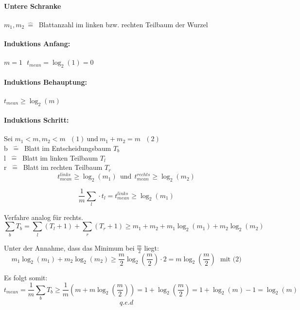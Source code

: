\vspace{30pt}
\paragraph{Untere Schranke}
$m_1, m_2 ~\hat{=}~$ Blattanzahl im linken bzw. rechten Teilbaum der Wurzel
\vspace{100pt}

\paragraph{Induktions Anfang:} $m=1 ~~~ t_{mean} = \log_2(1)=0$

\paragraph{Induktions Behauptung:} $t_{mean} \geq \log_2(m)$

\paragraph{Induktions Schritt:} Sei $m_1 < m, m_2 < m ~~~(1) ~\text{und}~ m_1+m_2=m ~~~(2)$ \\

b $~\hat{=}~$ Blatt im Entscheidungsbaum $T_b$\\
l $~\hat{=}~$ Blatt im linken Teilbaum $T_l$\\
r $~\hat{=}~$ Blatt im rechten Teilbaum $T_r$\\

\[t^{links}_{mean} \geq \log_2(m_1) ~~\text{und}~~t^{rechts}_{mean} \geq \log_2(m_2)\]

\[\frac{1}{m} \sum_{l} \cdot t_l = t^{links}_{mean}  \geq \log_2(m_1) \]

Verfahre analog für rechts.\\

\[\sum_b T_b = \sum_l (T_l+1) + \sum_r (T_r+1) \geq m_1+m_2 + m_1 \log_2(m_1) + m_2 \log_2(m_2) \]

Unter der Annahme, dass das Minimum bei $\frac{m}{2}$ liegt:
\[m_1 \log_2(m_1) + m_2 \log_2(m_2) \geq \frac{m}{2} \log_2 \left(\frac{m}{2} \right) \cdot 2 = m \log_2 \left(\frac{m}{2} \right) ~~~\text{mit (2)} \] 

Es folgt somit: 
\[ t_{mean} = \frac{1}{m} \sum_b T_b \geq  \frac{1}{m}\left(m+m\log_2\left( \frac{m}{2}\right)\right) = 1+ \log_2\left( \frac{m}{2}\right) = 1+ \log_2(m) -1 = \log_2(m) \]
\[q.e.d\]



